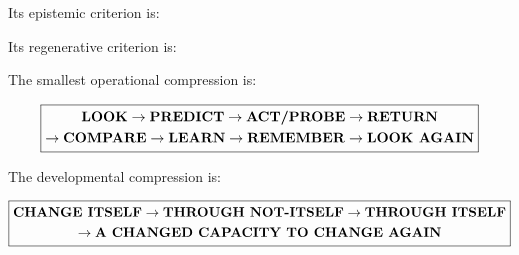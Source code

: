 \documentclass[
]{article}
\begin{document}
Its epistemic criterion is:

\begin{center}
\end{center}

Its regenerative criterion is:

\begin{center}
\end{center}

The smallest operational compression is:

\[
\boxed{
\begin{gathered}
\text{\textbf{LOOK}}
\to
\text{\textbf{PREDICT}}
\to
\text{\textbf{ACT/PROBE}}
\to
\text{\textbf{RETURN}}\\
\to
\text{\textbf{COMPARE}}
\to
\text{\textbf{LEARN}}
\to
\text{\textbf{REMEMBER}}
\to
\text{\textbf{LOOK AGAIN}}
\end{gathered}
}
\]

The developmental compression is:

\[
\boxed{
\begin{gathered}
\text{\textbf{CHANGE ITSELF}}
\to
\text{\textbf{THROUGH NOT-ITSELF}}
\to
\text{\textbf{THROUGH ITSELF}}\\
\to
\text{\textbf{A CHANGED CAPACITY TO CHANGE AGAIN}}
\end{gathered}
}
\]
\end{document}
